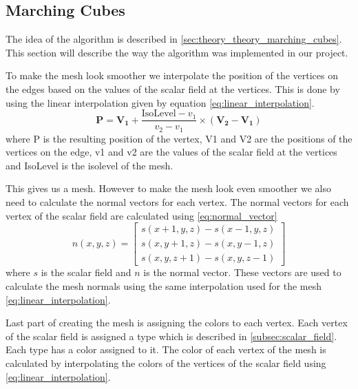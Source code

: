 \subsection{Marching Cubes} \label{subsec:marching_cubes}
The idea of the algorithm is described in \autoref*{sec:theory_theory_marching_cubes}.
This section will describe the way the algorithm was implemented in our project.

To make the mesh look smoother we interpolate the position of the vertices on the edges based on the values of the scalar field at the vertices.
This is done by using the linear interpolation given by equation \autoref{eq:linear_interpolation}.
\begin{equation}
  \label{eq:linear_interpolation}
  \mathbf{P} = \mathbf{V_1} + \frac{\text{IsoLevel} - v_1}{v_2 - v_1} \times (\mathbf{V_2} - \mathbf{V_1})
\end{equation}
where P is the resulting position of the vertex, V1 and V2 are the positions of the vertices on the edge, v1 and v2 are the values of the scalar field at the vertices and IsoLevel is the isolevel of the mesh.
  
This gives us a mesh.
However to make the mesh look even smoother we also need to calculate the normal vectors for each vertex.
The normal vectors for each vertex of the scalar field are calculated using \autoref*{eq:normal_vector}
\begin{equation}
    \label{eq:normal_vector}
    n(x, y, z) = \begin{bmatrix}
        s(x + 1, y, z) - s(x - 1, y, z) \\
        s(x, y + 1, z) - s(x, y - 1, z) \\
        s(x, y, z + 1) - s(x, y, z - 1)
      \end{bmatrix}
\end{equation}
where $s$ is the scalar field and $n$ is the normal vector.
These vectors are used to calculate the mesh normals using the same interpolation used for the mesh \autoref{eq:linear_interpolation}.

Last part of creating the mesh is assigning the colors to each vertex.
Each vertex of the scalar field is assigned a type which is described in \autoref*{subsec:scalar_field}.
Each type has a color assigned to it.
The color of each vertex of the mesh is calculated by interpolating the colors of the vertices of the scalar field using \autoref{eq:linear_interpolation}.

